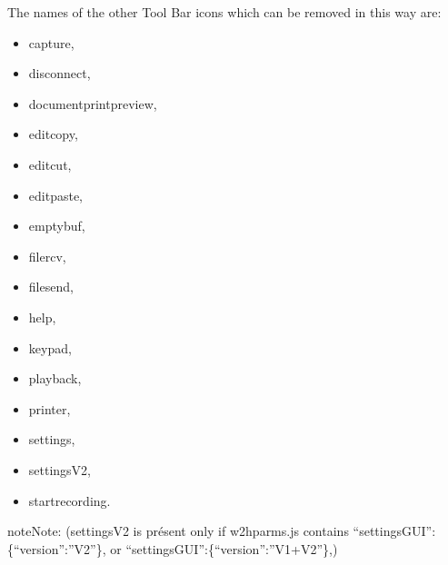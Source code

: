 \documentclass[letterpaper,10pt,english]{sphinxmanual}
\begin{document}
\sphinxAtStartPar
The names of the other Tool Bar icons which can be removed in this way are:
\begin{itemize}
\item {} 
\sphinxAtStartPar
capture,

\item {} 
\sphinxAtStartPar
disconnect,

\item {} 
\sphinxAtStartPar
document\sphinxhyphen{}print\sphinxhyphen{}preview,

\item {} 
\sphinxAtStartPar
edit\sphinxhyphen{}copy,

\item {} 
\sphinxAtStartPar
edit\sphinxhyphen{}cut,

\item {} 
\sphinxAtStartPar
edit\sphinxhyphen{}paste,

\item {} 
\sphinxAtStartPar
emptybuf,

\item {} 
\sphinxAtStartPar
file\sphinxhyphen{}rcv,

\item {} 
\sphinxAtStartPar
file\sphinxhyphen{}send,

\item {} 
\sphinxAtStartPar
help,

\item {} 
\sphinxAtStartPar
keypad,

\item {} 
\sphinxAtStartPar
playback,

\item {} 
\sphinxAtStartPar
printer,

\item {} 
\sphinxAtStartPar
settings,

\item {} 
\sphinxAtStartPar
settingsV2,

\item {} 
\sphinxAtStartPar
startrecording.

\end{itemize}

\begin{sphinxadmonition}{note}{Note:}
\sphinxAtStartPar
(settingsV2 is présent only if w2hparms.js contains “settingsGUI”:\{“version”:”V2”\}, or “settingsGUI”:\{“version”:”V1+V2”\},)
\end{sphinxadmonition}

\ignorespaces 
{}\ignorespaces 
\end{document}

